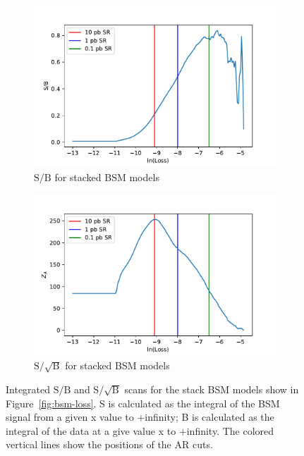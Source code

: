\begin{figure}[ht]
    \centering
    \begin{subfigure}[h]{0.45\linewidth}
    \includegraphics[scale=0.45]{figs/ch6/ar/BSMall_SoverB_vs_loss.pdf}%
    \caption{$\textrm{S}/\textrm{B}$ for stacked BSM models}
    \end{subfigure}
    \hfill
    \begin{subfigure}[h]{0.45\linewidth}
    \includegraphics[scale=0.45]{figs/ch6/ar/BSMall_ZA_vs_loss.pdf}%
    \caption{$\textrm{S}/\sqrt{\textrm{B}}$ for stacked BSM models}
    \end{subfigure}
    \hfill
    \caption{Integrated $\textrm{S}/\textrm{B}$ and $\textrm{S}/\sqrt{\textrm{B}}$ scans for the stack BSM models show in Figure~\ref{fig:bsm-loss}. S is calculated as the integral of the BSM signal from a given x value to $+$infinity; B is calculated as the integral of the data at a give value x to $+$infinity. The colored vertical lines show the positions of the AR cuts. }
\label{fig:sb-comp}
\end{figure}


